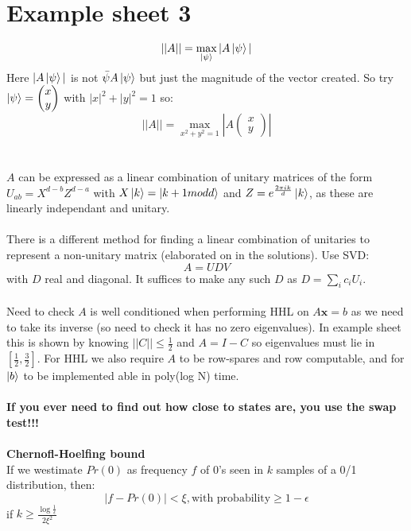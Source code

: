 \documentclass{article}
\begin{document}
\section{Example sheet 3}
$$
 || A || = \max_{\ket{\psi}} |A \ket{\psi}|
$$
Here $|A \ket{\psi}|$ is not $\bar{\psi} A \ket{\psi}$ but just the magnitude of the vector created.
So try $\ket{\psi} = \begin{pmatrix} x \\ y \end{pmatrix}$ with $|x|^2 + |y|^2 = 1$ so:$$
|| A || = \max_{x^2 + y^2 =1} |A \begin{pmatrix} x\\ y \end{pmatrix}|
$$\\\\
$A$ can be expressed as a linear combination of unitary matrices of the form $U_{ab} = X^{d-b} Z^{d-a}$ with $X \ket{k} = \ket{ k + 1 mod d}$ and $Z = e^{ \frac{2\pi i k}{d}} \ket{k}$, as these are linearly independant and unitary.\\\\
There is a different method for finding a linear combination of unitaries to represent a non-unitary matrix (elaborated on in the solutions). Use SVD:
$$
A = UDV
$$
with $D$ real and diagonal. It suffices to make any such $D$ as $D = \sum_i c_i U_i$.\\\\
Need to check $A$ is well conditioned when performing HHL on $A\bm x = b$ as we need to take its inverse (so need to check it has no zero eigenvalues). In example sheet this is shown by knowing $||C|| \leq \frac{1}{2}$ and $A = I - C$ so eigenvalues must lie in $[\frac{1}{2}, \frac{3}{2}]$. For HHL we also require $A$ to be row-spares and row computable, and for $\ket{b}$ to be implemented able in poly(log N) time.\\\\
\textbf{If you ever need to find out how close to states are,  you use the swap test!!!}\\\\
\textbf{Chernofl-Hoelfing bound}\\
If we westimate $Pr(0)$ as frequency $f$ of 0's seen in $k$ samples of a 0/1 distribution, then:
$$
 |f - Pr(0)| < \xi, \text{with probability} \geq 1 - \epsilon
$$
if $k \geq \frac{\log \frac{1}{\epsilon}}{2 \xi^2}$\\\\
\end{document}
